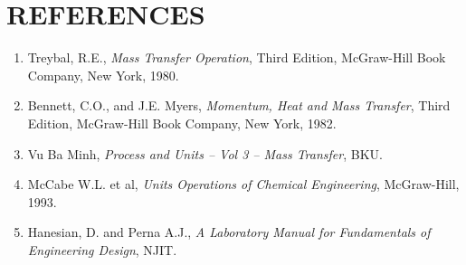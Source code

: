 \section{REFERENCES}

\begin{enumerate}
    \item Treybal, R.E., \textit{Mass Transfer Operation}, Third Edition, McGraw-Hill Book Company, New York, 1980.
    \item Bennett, C.O., and J.E. Myers, \textit{Momentum, Heat and Mass Transfer}, Third Edition, McGraw-Hill Book Company, New York, 1982.
    \item Vu Ba Minh, \textit{Process and Units -- Vol 3 -- Mass Transfer}, BKU.
    \item McCabe W.L. et al, \textit{Units Operations of Chemical Engineering}, McGraw-Hill, 1993.
    \item Hanesian, D. and Perna A.J., \textit{A Laboratory Manual for Fundamentals of Engineering Design}, NJIT.
\end{enumerate}
